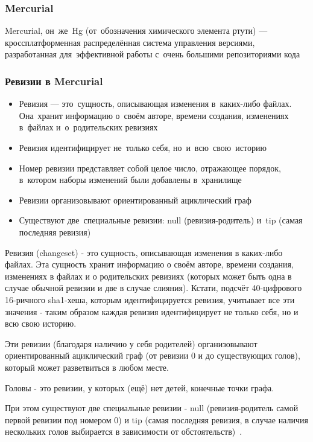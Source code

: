 \documentclass{../industrial-development}
\begin{document}
\begin{frame} \frametitle{Mercurial}
  \begin{block}{}
    \alert{Mercurial, он~же~Hg (от~обозначения химического элемента ртути)} --- кроссплатформенная распределённая система управления версиями, разработанная для~эффективной работы с~очень большими репозиториями кода
  \end{block}
\end{frame}

\begin{frame} \frametitle{Ревизии в Mercurial}
  \begin{itemize}
  \item Ревизия --- это~сущность, описывающая изменения в~каких-либо файлах. Она~хранит информацию о~своём авторе, времени создания, изменениях в~файлах и~о~родительских ревизиях
  \item Ревизия идентифицирует не~только себя, но~и~всю~свою~историю
  \item Номер ревизии представляет собой целое число, отражающее порядок, в~котором наборы изменений были добавлены в~хранилище
  \item Ревизии организовывают ориентированный ациклический граф
  \item Существуют две~специальные ревизии: null (ревизия-родитель) и~tip (самая последняя ревизия)
  \end{itemize}
\end{frame}

\lecturenotes

Ревизия (changeset) - это сущность, описывающая изменения в каких-либо файлах. Эта сущность хранит информацию о своём авторе, времени создания, изменениях в файлах и о родительских ревизиях (которых может быть одна в случае обычной ревизии и две в случае слияния). Кстати, подсчёт 40-цифрового 16-ричного sha1-хеша, которым идентифицируется ревизия, учитывает все эти значения - таким образом каждая ревизия идентифицирует не только себя, но и всю свою историю.

Эти ревизии (благодаря наличию у себя родителей) организовывают ориентированный ациклический граф (от ревизии 0 и до существующих голов), который может разветвиться в любом месте.

Головы - это ревизии, у которых (ещё) нет детей, конечные точки графа.

При этом существуют две специальные ревизии - null (ревизия-родитель самой первой ревизии под номером 0) и tip (самая последняя ревизия, в случае наличия нескольких голов выбирается в зависимости от обстоятельств)~\cite{MercurialSolovyov}.
\end{document}
